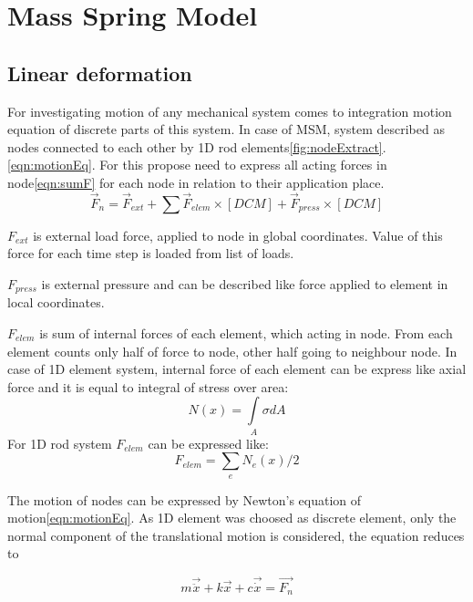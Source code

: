 \section*{Mass Spring Model}
\subsection*{Linear deformation}
For investigating motion of any mechanical system comes to integration motion equation of
discrete parts of this system. In case of MSM, system described as nodes connected to each other 
by 1D rod elements\ref{fig:nodeExtract}. \eqref{eqn:motionEq}. For this propose need to express all acting forces in
node\eqref{eqn:sumF} for each node in relation to their application place.
\begin{equation}\label{eqn:sumF}
  \vec{F}_n= \vec{F}_{ext} + \sum\vec{F}_{elem}\times[DCM] + \vec{F}_{press}\times[DCM]
\end{equation}\par
$F_{ext}$ is external load force, applied to node in global coordinates. Value of this force for
each time step is loaded from list of loads.\par $F_{press}$ is external pressure and can be
described like force applied to element in local coordinates.\par $F_{elem}$ is sum of internal
forces of each element, which acting in node. From each element counts only half of force to node,
other half going to neighbour node. In case of 1D element system, internal force of each element can
be express like axial force and it is equal to integral of stress over area:
\begin{equation}\label{eqn:Nx}
  N(x)= \int\limits_A \sigma dA
\end{equation}
For 1D rod system $F_{elem}$ can be expressed like:
\begin{equation}\label{eqn:Felem}
  F_{elem} = \sum_{e}N_e(x)/2
\end{equation}\par
The motion of nodes can be expressed by Newton's equation of motion\ref{eqn:motionEq}. As 1D
element was choosed as discrete element, only the normal component of the
translational motion is considered, the equation reduces to\par
\begin{equation}\label{eqn:motionEq}
  m\vec{\ddot{x}} + k\vec{x} + c\vec{\dot{x}} = \vec{F_n}
\end{equation}
